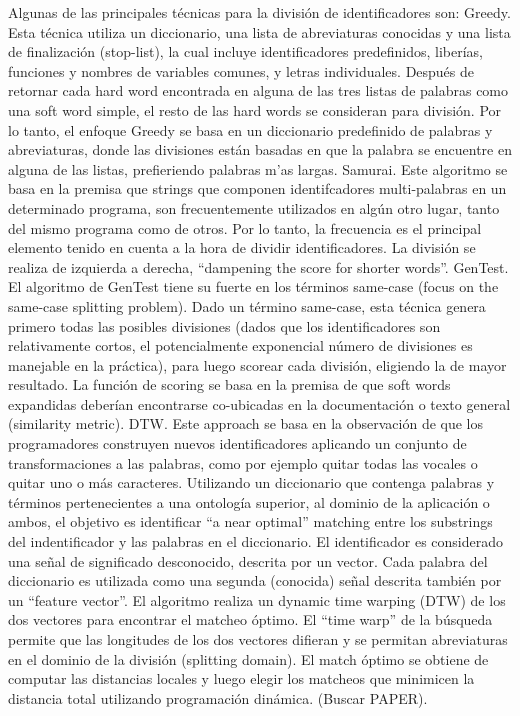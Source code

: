 Algunas de las principales técnicas para la división de identificadores son:
Greedy. Esta técnica utiliza un diccionario, una lista de abreviaturas conocidas y una lista de finalización (stop-list), la cual incluye identificadores predefinidos, liberías, funciones y nombres de variables comunes, y letras individuales. Después de retornar cada hard word encontrada en alguna de las tres listas de palabras como una soft word simple, el resto de las hard words se consideran para división. Por lo tanto, el enfoque Greedy se basa en un diccionario predefinido de palabras y abreviaturas, donde las divisiones están basadas en que la palabra se encuentre en alguna de las listas, prefieriendo palabras m’as largas.
Samurai. Este algoritmo se basa en la premisa que strings que componen identifcadores multi-palabras en un determinado programa, son frecuentemente utilizados en algún otro lugar, tanto del mismo programa como de otros. Por lo tanto, la frecuencia es el principal elemento tenido en cuenta a la hora de dividir identificadores. La división se realiza de izquierda a derecha, “dampening the score for shorter words”.
GenTest. El algoritmo de GenTest tiene su fuerte en los términos same-case (focus on the same-case splitting problem). Dado un término same-case, esta técnica genera primero todas las posibles divisiones (dados que los identificadores son relativamente cortos, el potencialmente exponencial número de divisiones es manejable en la práctica), para luego scorear cada división, eligiendo la de mayor resultado. La función de scoring se basa en la premisa de que soft words expandidas deberían encontrarse co-ubicadas en la documentación o texto general (similarity metric).
DTW. Este approach se basa en la observación de que los programadores construyen nuevos identificadores aplicando un conjunto de transformaciones a las palabras, como por ejemplo quitar todas las vocales o quitar uno o más caracteres. Utilizando un diccionario que contenga palabras y términos pertenecientes a una ontología superior, al dominio de la aplicación o ambos, el objetivo es identificar “a near optimal” matching entre los substrings del indentificador y las palabras en el diccionario. El identificador es considerado una señal de significado desconocido, descrita por un vector. Cada palabra del diccionario es utilizada como una segunda (conocida) señal  descrita también por un “feature vector”. El algoritmo realiza un dynamic time warping (DTW) de los dos vectores para encontrar el matcheo óptimo. El “time warp” de la búsqueda permite que las longitudes de los dos vectores difieran y se permitan abreviaturas en el dominio de la división (splitting domain). El match óptimo se obtiene de computar las distancias locales y luego elegir los matcheos que minimicen la distancia total utilizando programación dinámica. (Buscar PAPER).

